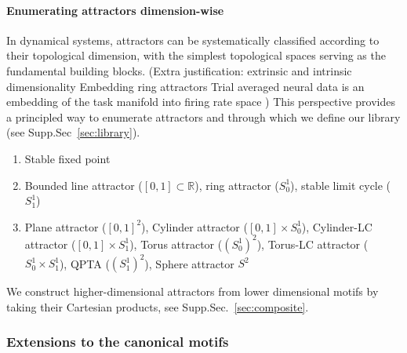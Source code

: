 \documentclass{article}
\newcommand{\ascomment}[1]{\textcolor{ascolor}{(#1)}}
\theoremstyle{definition} \newtheorem{definition}{Definition}  \newtheorem{example}{Example}
\theoremstyle{remark} \newtheorem{remark}{Remark}
\newcounter{ct}
\newcommand{\field}[1]{\ensuremath{\mathbb{#1}}}
\newcommand{\reals}{\field{R}}
\begin{document}
\paragraph{Enumerating attractors dimension-wise}
In dynamical systems, attractors can be systematically classified according to their topological dimension, with the simplest topological spaces serving as the fundamental building blocks.
\ascomment{Extra justification:
extrinsic and intrinsic dimensionality\citep{jazayeri2021interpreting}
%
Embedding ring attractors \citep{chaudhuri2019attractor}\citep{Sagodi2024a}
Trial averaged neural data is an embedding of the task manifold into firing rate space \citep{gao2015simplicity}
}
 This perspective provides a principled way to enumerate attractors and through which we define our library (see Supp.Sec~\ref{sec:library}).
\begin{enumerate}[start=0,label={\bfseries Dim \arabic*:}]
\item  Stable fixed point
\item  Bounded line attractor ($[0,1]\subset\reals$), ring attractor ($S_0^1$), stable limit cycle ($S_1^1$)
\item Plane attractor ($[0,1]^2$), Cylinder attractor ($[0,1]\times S_0^1$), Cylinder-LC attractor ($[0,1]\times S_1^1$), Torus attractor ($(S_0^1)^2$), Torus-LC attractor ($S_0^1\times S_1^1$), QPTA ($(S_1^1)^2$), Sphere attractor $S^2$
\end{enumerate}
We construct  higher-dimensional attractors from lower dimensional motifs by taking their Cartesian products, see Supp.Sec.~\ref{sec:composite}.








\subsubsection{Extensions to the canonical motifs}\label{sec:extensions}
\end{document}
